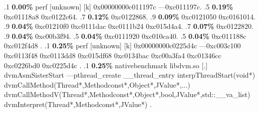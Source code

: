 \begin{profile}
{.1 \textbf{ 0.00\%} perf             [unknown]              [k] 0x00000000c011197c\newline {} ---0xc011197c. 
.5 \textbf{0.19\%} 0xc01118a8\newline {} 0xc0122c64. 
.7 \textbf{0.12\%} 0xc0122868. 
.9 \textbf{0.09\%} 0xc0121050\newline {} 0xc0161014. 
.9 \textbf{0.04\%} 0xc01210f0\newline {} 0xc0111dac\newline {} 0xc0111b24\newline {} 0xc015d4a4. 
.7 \textbf{0.07\%} 0xc0122820. 
.9 \textbf{0.04\%} 0xc00b3f94. 
.5 \textbf{0.04\%} 0xc0111920\newline {} 0xc010ca40. 
.5 \textbf{0.04\%} 0xc011188c\newline {} 0xc012f4d8\newline {} . 
.1 \textbf{ 0.25\%} perf             [unknown]              [k] 0x00000000c0225d4c\newline {} ---0xc003c100\newline {} 0xc0113f48\newline {} 0xc0113dd8\newline {} 0xc015df68\newline {} 0xc0134bac\newline {} 0xc00a3fa4\newline {} 0xc01346cc\newline {} 0xc0226bd0\newline {} 0xc0225d4c\newline {} . 
.1 \textbf{ 0.25\%} nativebenchmark  libdvm.so              [.] dvmAsmSisterStart\newline {} ---pthread\_create\newline {} \_\_thread\_entry\newline {} interpThreadStart(void*)\newline {} dvmCallMethod(Thread*,Methodconst*,Object*,JValue*,...)\newline {} dvmCallMethodV(Thread*,Methodconst*,Object*,bool,JValue*,std::\_\_va\_list)\newline {} dvmInterpret(Thread*,Methodconst*,JValue*)\newline {} . 
}
\end{profile}
